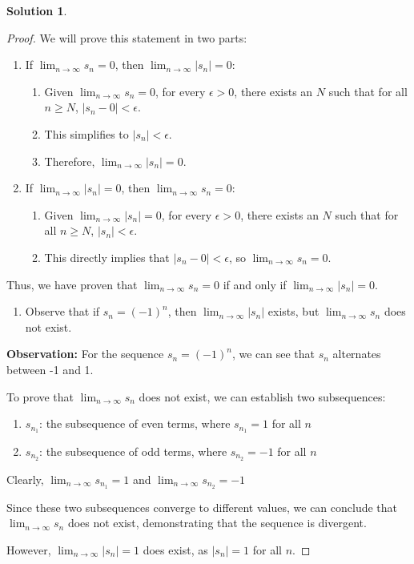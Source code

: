 \documentclass[12pt]{article}
\theoremstyle{definition} %
\newtheorem{solution}{Solution}
\theoremstyle{plain} %
\begin{document}
\begin{solution}
   \begin{proof}
    We will prove this statement in two parts:
\begin{enumerate}
    \item If $\lim_{n \to \infty} s_n = 0$, then $\lim_{n \to \infty} |s_n| = 0$:
    \begin{enumerate}
        \item Given $\lim_{n \to \infty} s_n = 0$, for every $\epsilon > 0$, there exists an $N$ such that for all $n \geq N$, $|s_n - 0| < \epsilon$.
        \item This simplifies to $|s_n| < \epsilon$.
        \item Therefore, $\lim_{n \to \infty} |s_n| = 0$.
    \end{enumerate}
    \item If $\lim_{n \to \infty} |s_n| = 0$, then $\lim_{n \to \infty} s_n = 0$:
    \begin{enumerate}
        \item Given $\lim_{n \to \infty} |s_n| = 0$, for every $\epsilon > 0$, there exists an $N$ such that for all $n \geq N$, $|s_n| < \epsilon$.
        \item This directly implies that $|s_n - 0| < \epsilon$, so $\lim_{n \to \infty} s_n = 0$.
    \end{enumerate}
\end{enumerate}
Thus, we have proven that $\lim_{n \to \infty} s_n = 0$ if and only if $\lim_{n \to \infty} |s_n| = 0$. 

\begin{enumerate}[resume]
    \item Observe that if $s_{n}=(-1)^n$, then $\lim_{ n \to \infty }|s_{n}|$ exists, but $\lim_{ n \to \infty }s_{n}$ does not exist.
\end{enumerate}

\textbf{Observation:} For the sequence $s_n = (-1)^n$, we can see that $s_n$ alternates between -1 and 1.

To prove that $\lim_{n \to \infty} s_n$ does not exist, we can establish two subsequences:
\begin{enumerate}
    \item $s_{n_1}$: the subsequence of even terms, where $s_{n_1} = 1$ for all $n$
    \item $s_{n_2}$: the subsequence of odd terms, where $s_{n_2} = -1$ for all $n$
\end{enumerate}

Clearly, $\lim_{n \to \infty} s_{n_1} = 1$ and $\lim_{n \to \infty} s_{n_2} = -1$

Since these two subsequences converge to different values, we can conclude that $\lim_{n \to \infty} s_n$ does not exist, demonstrating that the sequence is divergent.

However, $\lim_{n \to \infty} |s_n| = 1$ does exist, as $|s_n| = 1$ for all $n$.

   \end{proof} 
\end{solution}
\end{document}
